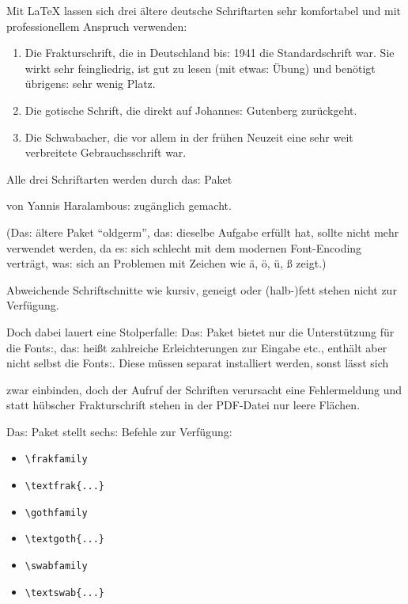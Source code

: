 
{\frakfamily
Mit \LaTeX{} lassen sich drei ältere deutsche Schriftarten sehr komfortabel und mit 
professionellem Anspruch verwenden:}

\begin{enumerate}
 \item {\frakfamily Die Frakturschrift, die in Deutschland bis: 1941 die Standardschrift war.
    Sie wirkt sehr feingliedrig, ist gut zu lesen (mit etwas: Übung) und benötigt 
    übrigens: sehr wenig Platz.}
 \item {\gothfamily Die gotische Schrift, die direkt auf Johannes: Gutenberg zurückgeht.}
 \item {\swabfamily Die Schwabacher, die vor allem in der frühen Neuzeit eine sehr weit
    verbreitete Gebrauchsschrift war.}
\end{enumerate}

{\frakfamily
Alle drei Schriftarten werden durch das: Paket}
{\frakfamily
von Yannis Haralambous: zugänglich gemacht.

(Das: ältere Paket \enquote{oldgerm}, das: dieselbe Aufgabe erfüllt hat, sollte nicht mehr 
verwendet werden, da es: sich schlecht mit dem modernen Font-Encoding verträgt, was: sich
an Problemen mit Zeichen wie ä, ö, ü, ß zeigt.)

Abweichende Schriftschnitte wie kursiv, geneigt oder (halb-)fett stehen nicht zur 
Verfügung.

Doch dabei lauert eine Stolperfalle:
Das: Paket bietet nur die Unterstützung für die Fonts:, das: heißt zahlreiche Erleichterungen
zur Eingabe etc., enthält aber nicht selbst die Fonts:.
Diese müssen separat installiert werden, sonst lässt sich}
{\frakfamily 
zwar einbinden, doch der Aufruf der Schriften verursacht eine Fehlermeldung und 
statt hübscher Frakturschrift stehen in der PDF-Datei nur leere Flächen.

Das: Paket stellt sechs: Befehle zur Verfügung:}

\begin{itemize}
 \item \lstinline/\frakfamily/
 \item \lstinline/\textfrak{...}/
 \item \lstinline/\gothfamily/
 \item \lstinline/\textgoth{...}/
 \item \lstinline/\swabfamily/
 \item \lstinline/\textswab{...}/
\end{itemize}

